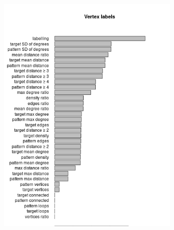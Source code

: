 \documentclass{l4proj}
\theoremstyle{definition}
\theoremstyle{remark}
\begin{document}
\begin{figure}
  \centering
  \begin{subfigure}[t]{0.49\textwidth}
    \centering
    \includegraphics[width=\textwidth]{images/vertex_labels_var_used.png}
  \end{subfigure}
  \begin{subfigure}[t]{0.49\textwidth}
    \centering

\end{subfigure}
\end{figure}
\end{document}
